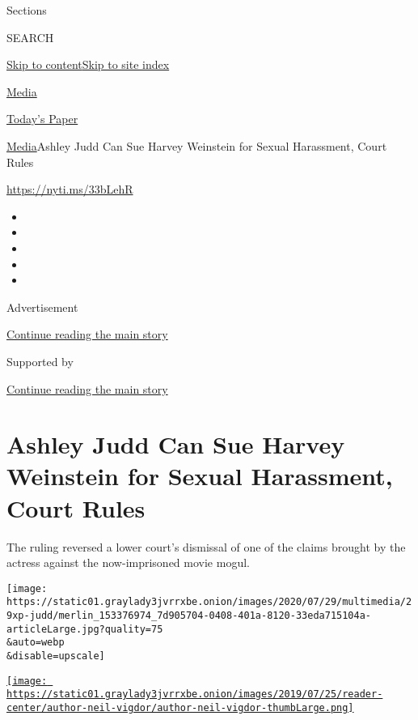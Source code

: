 Sections

SEARCH

\protect\hyperlink{site-content}{Skip to
content}\protect\hyperlink{site-index}{Skip to site index}

\href{https://www.nytimes3xbfgragh.onion/section/business/media}{Media}

\href{https://myaccount.nytimes3xbfgragh.onion/auth/login?response_type=cookie\&client_id=vi}{}

\href{https://www.nytimes3xbfgragh.onion/section/todayspaper}{Today's
Paper}

\href{/section/business/media}{Media}\textbar{}Ashley Judd Can Sue
Harvey Weinstein for Sexual Harassment, Court Rules

\url{https://nyti.ms/33bLehR}

\begin{itemize}
\item
\item
\item
\item
\item
\end{itemize}

Advertisement

\protect\hyperlink{after-top}{Continue reading the main story}

Supported by

\protect\hyperlink{after-sponsor}{Continue reading the main story}

\hypertarget{ashley-judd-can-sue-harvey-weinstein-for-sexual-harassment-court-rules}{%
\section{Ashley Judd Can Sue Harvey Weinstein for Sexual Harassment,
Court
Rules}\label{ashley-judd-can-sue-harvey-weinstein-for-sexual-harassment-court-rules}}

The ruling reversed a lower court's dismissal of one of the claims
brought by the actress against the now-imprisoned movie mogul.

\texttt{[image: https://static01.graylady3jvrrxbe.onion/images/2020/07/29/multimedia/29xp-judd/merlin\_153376974\_7d905704-0408-401a-8120-33eda715104a-articleLarge.jpg?quality=75\\\&auto=webp\\\&disable=upscale]}

\href{https://www.nytimes3xbfgragh.onion/by/neil-vigdor}{\texttt{[image: https://static01.graylady3jvrrxbe.onion/images/2019/07/25/reader-center/author-neil-vigdor/author-neil-vigdor-thumbLarge.png]}}

